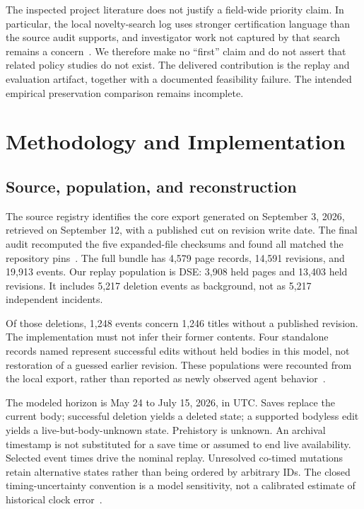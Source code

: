 \documentclass[11pt]{article}
\newcommand{\repo}[1]{{\small\path{#1}}}
\begin{document}
The inspected project literature does not justify a field-wide priority claim. In particular, the local novelty-search log uses stronger certification language than the source audit supports, and investigator work not captured by that search remains a concern~\cite{sourceaudit}. We therefore make no ``first'' claim and do not assert that related policy studies do not exist. The delivered contribution is the replay and evaluation artifact, together with a documented feasibility failure. The intended empirical preservation comparison remains incomplete.

\section{Methodology and Implementation}
\subsection{Source, population, and reconstruction}
The source registry identifies the core export generated on September 3, 2026, retrieved on September 12, with a published cut on revision write date. The final audit recomputed the five expanded-file checksums and found all matched the repository pins~\cite{export,verification}. The full bundle has 4,579 page records, 14,591 revisions, and 19,913 events. Our replay population is DSE: 3,908 held pages and 13,403 held revisions. It includes 5,217 deletion events as background, not as 5,217 independent incidents.

Of those deletions, 1,248 events concern 1,246 titles without a published revision. The implementation must not infer their former contents. Four standalone records named \repo{revert} represent successful edits without held bodies in this model, not restoration of a guessed earlier revision. These populations were recounted from the local export, rather than reported as newly observed agent behavior~\cite{verification,sourceaudit}.

The modeled horizon is May 24 to July 15, 2026, in UTC. Saves replace the current body; successful deletion yields a deleted state; a supported bodyless edit yields a live-but-body-unknown state. Prehistory is unknown. An archival timestamp is not substituted for a save time or assumed to end live availability. Selected event times drive the nominal replay. Unresolved co-timed mutations retain alternative states rather than being ordered by arbitrary IDs. The closed timing-uncertainty convention is a model sensitivity, not a calibrated estimate of historical clock error~\cite{contract}.
\end{document}
